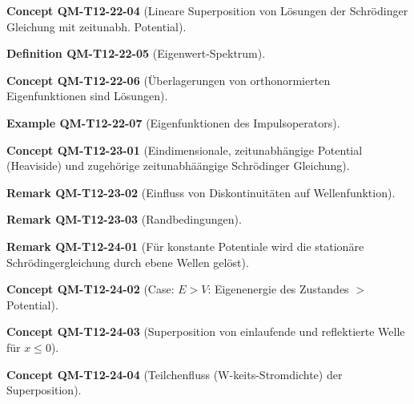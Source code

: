\documentclass[10pt, letterpaper]{article}
\newcommand{\CustomHeading}[3]{%
  \par\medskip\noindent%
  \textbf{#1 #2} \textnormal{(#3)}.\enskip%
}
\newenvironment{DEF}[2]{\CustomHeading{Definition}{#1}{#2}}{}
\newenvironment{REM}[2]{\CustomHeading{Remark}{#1}{#2}}{}
\newenvironment{EXA}[2]{\CustomHeading{Example}{#1}{#2}}{}
\newenvironment{CONC}[2]{\CustomHeading{Concept}{#1}{#2}}{}
\begin{document}
\begin{CONC}{QM-T12-22-04}{Lineare Superposition von Lösungen der Schrödinger Gleichung mit zeitunabh. Potential}
\end{CONC}

\begin{DEF}{QM-T12-22-05}{Eigenwert-Spektrum}
\end{DEF}

\begin{CONC}{QM-T12-22-06}{Überlagerungen von orthonormierten Eigenfunktionen sind Lösungen}
\end{CONC}

\begin{EXA}{QM-T12-22-07}{Eigenfunktionen des Impulsoperators}
\end{EXA}

\begin{CONC}{QM-T12-23-01}{Eindimensionale, zeitunabhängige Potential (Heaviside) und zugehörige zeitunabhäängige Schrödinger Gleichung}
\end{CONC}

\begin{REM}{QM-T12-23-02}{Einfluss von Diskontinuitäten auf Wellenfunktion}
\end{REM}

\begin{REM}{QM-T12-23-03}{Randbedingungen}
\end{REM}

\begin{REM}{QM-T12-24-01}{Für konstante Potentiale wird die stationäre Schrödingergleichung durch ebene Wellen gelöst}
\end{REM}

\begin{CONC}{QM-T12-24-02}{Case: $E>V$: Eigenenergie des Zustandes $>$ Potential}
\end{CONC}

\begin{CONC}{QM-T12-24-03}{Superposition von einlaufende und reflektierte Welle für $x\leq 0$}
\end{CONC}

\begin{CONC}{QM-T12-24-04}{Teilchenfluss (W-keits-Stromdichte) der Superposition}
\end{CONC}
\end{document}
